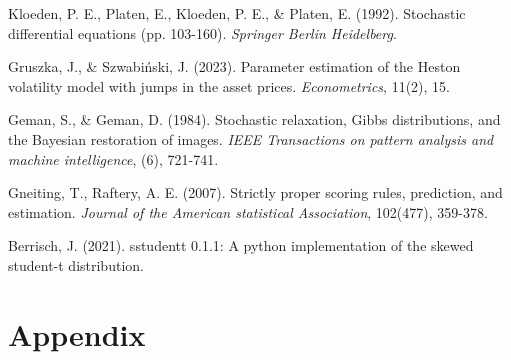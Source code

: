 \documentclass[12pt,a4paper]{article}
\numberwithin{equation}{section}
\begin{document}
\begin{thebibliography}{11}
\bibitem{}
Kloeden, P. E., Platen, E., Kloeden, P. E., \& Platen, E. (1992). Stochastic differential equations (pp. 103-160). \emph{Springer Berlin Heidelberg}.

\bibitem{}
Gruszka, J., \& Szwabiński, J. (2023). Parameter estimation of the Heston volatility model with jumps in the asset prices. \emph{Econometrics}, 11(2), 15.

\bibitem{}
Geman, S., \& Geman, D. (1984). Stochastic relaxation, Gibbs distributions, and the Bayesian restoration of images. \emph{IEEE Transactions on pattern analysis and machine intelligence}, (6), 721-741.

\bibitem{}
Gneiting, T., Raftery, A. E. (2007). Strictly proper scoring rules, prediction, and estimation. \emph{Journal of the American statistical Association}, 102(477), 359-378.

\bibitem{}
Berrisch, J. (2021). sstudentt 0.1.1: A python implementation of the skewed student-t distribution.

\end{thebibliography}
\newpage
\section*{Appendix}



 


%
%



\setcounter{equation}{0}
\renewcommand\theequation{\Alph{section}.\arabic{equation}}	
\setcounter{table}{0}
\renewcommand\thetable{\Alph{section}.\arabic{table}}
\setcounter{figure}{0}
\renewcommand\thefigure{\Alph{section}.\arabic{figure}}
\end{document}
